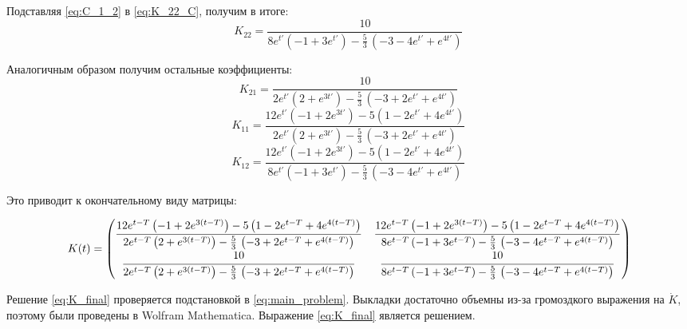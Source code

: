 \documentclass[a4paper,12pt]{article}
\begin{document}
    Подставляя \eqref{eq:C_1_2} в \eqref{eq:K_22_C}, получим в итоге:
    \begin{equation}
        \label{eq:K_22_final}
        K_{22} = \frac{10}{8e^{t'} \left( -1 + 3e^{t'} \right) - \frac{5}{3}\, \left( -3 - 4e^{t'} + e^{4t'} \right)   }\,
    \end{equation}

    Аналогичным образом получим остальные коэффициенты:
    \begin{equation}
        \label{eq:K_21_final}
        K_{21} = \frac{10}{2e^{t'} \left( 2 + e^{3t'} \right) - \frac{5}{3}\, \left( -3 + 2e^{t'} + e^{4t'} \right)   }\,
    \end{equation}
    \begin{equation}
        \label{eq:K_11_final}
        K_{11} = \frac{12 e^{t'} \left( -1 + 2 e^{3t'} \right) - 5 \left( 1 - 2 e^{t'} + 4e^{4t'} \right)}{2e^{t'} \left( 2 + e^{3t'} \right) - \frac{5}{3}\, \left( -3 + 2e^{t'} + e^{4t'} \right)   }\,
    \end{equation}
    \begin{equation}
        \label{eq:K_11_final}
        K_{12} = \frac{12 e^{t'} \left( -1 + 2 e^{3t'} \right) - 5 \left( 1 - 2 e^{t'} + 4e^{4t'} \right)}{8e^{t'} \left( -1 + 3e^{t'} \right) - \frac{5}{3}\, \left( -3 - 4e^{t'} + e^{4t'} \right)   }\,
    \end{equation}

    Это приводит к окончательному виду матрицы:

    \begin{equation}
        \label{eq:K_final}
        K(t) = \begin{pmatrix}
            \cfrac{12 e^{t-T} \left( -1 + 2 e^{3(t-T)} \right) - 5 \left( 1 - 2 e^{t-T} + 4e^{4(t-T)} \right)}{2e^{t-T} \left( 2 + e^{3(t-T)} \right) - \frac{5}{3}\, \left( -3 + 2e^{t-T} + e^{4(t-T)} \right)   }\,
            & 
            \cfrac{12 e^{t-T} \left( -1 + 2 e^{3(t-T)} \right) - 5 \left( 1 - 2 e^{t-T} + 4e^{4(t-T)} \right)}{8e^{t-T} \left( -1 + 3e^{t-T} \right) - \frac{5}{3}\, \left( -3 - 4e^{t-T} + e^{4(t-T)} \right)   }\,
            \\
            \cfrac{10}{2e^{t-T} \left( 2 + e^{3(t-T)} \right) - \frac{5}{3}\, \left( -3 + 2e^{t-T} + e^{4(t-T)} \right)   }\,
            &
            \cfrac{10}{8e^{t-T} \left( -1 + 3e^{t-T} \right) - \frac{5}{3}\, \left( -3 - 4e^{t-T} + e^{4(t-T)} \right)   }\,
        \end{pmatrix}
    \end{equation}

    Решение \eqref{eq:K_final} проверяется подстановкой в \eqref{eq:main_problem}.
    Выкладки достаточно объемны из-за громоздкого выражения на $\dot{K}$, поэтому были проведены в Wolfram Mathematica. Выражение \eqref{eq:K_final} является решением.
\end{document}
